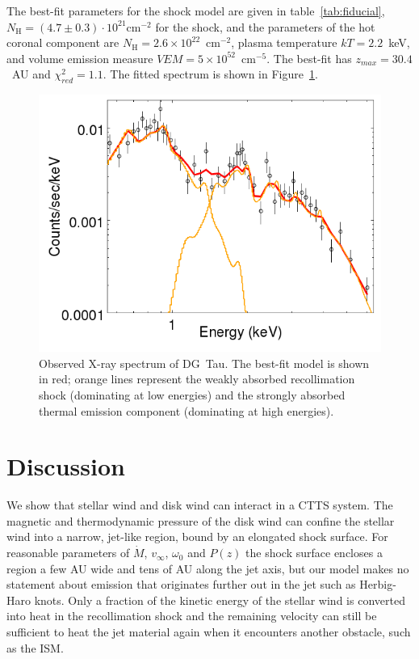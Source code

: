 \documentclass{emulateapj}
\begin{document}
The best-fit parameters for the shock model are given in table~\ref{tab:fiducial}, $N_\textrm{H}=(4.7\pm0.3)\cdot10^{21}\mathrm{ cm}^{-2}$ for the shock, and the parameters of the hot coronal component are $N_\textrm{H}=2.6\times10^{22}$~cm$^{-2}$, plasma temperature $kT = 2.2$~keV, and volume emission measure $VEM=5\times10^{52}$~cm$^{-5}$. The best-fit has $z_{max} = 30.4$~AU and $\chi^2_{red}= 1.1$. The fitted spectrum is shown in Figure~\ref{fig:fit}.

\begin{figure}[h!]
\begin{center}
\includegraphics[width=0.7\columnwidth]{figures/DGTaufit/DGTaufit.png}
\caption{\label{fig:fit}
Observed X-ray spectrum of DG~Tau. The best-fit model is shown in red; orange lines represent the weakly absorbed recollimation shock (dominating at low energies) and the strongly absorbed thermal emission component (dominating at high energies).}
\end{center}
\end{figure}

\section{Discussion}
\label{sect:discussion}
We show that stellar wind and disk wind can interact in a CTTS system. The magnetic and thermodynamic pressure of the disk wind can confine the stellar wind into a narrow, jet-like region, bound by an elongated shock surface. For reasonable parameters of $\dot M$, $v_\infty$, $\omega_0$ and $P(z)$ the shock surface encloses a region a few AU wide and tens of AU along the jet axis, but our model makes no statement about emission that originates further out in the jet such as Herbig-Haro knots. Only a fraction of the kinetic energy of the stellar wind is converted into heat in the recollimation shock and the remaining velocity can still be sufficient to heat the jet material again when it encounters another obstacle, such as the ISM.
\end{document}
